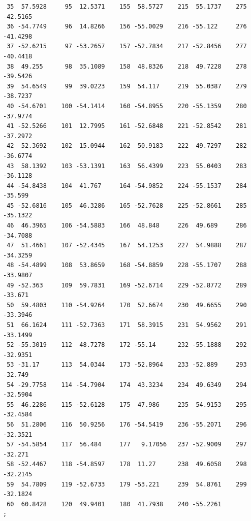 \documentclass{article}
\begin{document}
\begin{verbatim}
 35  57.5928     95  12.5371    155  58.5727    215  55.1737    275 -42.5165
 36 -54.7749     96  14.8266    156 -55.0029    216 -55.122     276 -41.4298
 37 -52.6215     97 -53.2657    157 -52.7834    217 -52.8456    277 -40.4418
 38  49.255      98  35.1089    158  48.8326    218  49.7228    278 -39.5426
 39  54.6549     99  39.0223    159  54.117     219  55.0387    279 -38.7237
 40 -54.6701    100 -54.1414    160 -54.8955    220 -55.1359    280 -37.9774
 41 -52.5266    101  12.7995    161 -52.6848    221 -52.8542    281 -37.2972
 42  52.3692    102  15.0944    162  50.9183    222  49.7297    282 -36.6774
 43  58.1392    103 -53.1391    163  56.4399    223  55.0403    283 -36.1128
 44 -54.8438    104  41.767     164 -54.9852    224 -55.1537    284 -35.599
 45 -52.6816    105  46.3286    165 -52.7628    225 -52.8661    285 -35.1322
 46  46.3965    106 -54.5883    166  48.848     226  49.689     286 -34.7088
 47  51.4661    107 -52.4345    167  54.1253    227  54.9888    287 -34.3259
 48 -54.4899    108  53.8659    168 -54.8859    228 -55.1707    288 -33.9807
 49 -52.363     109  59.7831    169 -52.6714    229 -52.8772    289 -33.671
 50  59.4803    110 -54.9264    170  52.6674    230  49.6655    290 -33.3946
 51  66.1624    111 -52.7363    171  58.3915    231  54.9562    291 -33.1499
 52 -55.3019    112  48.7278    172 -55.14      232 -55.1888    292 -32.9351
 53 -31.17      113  54.0344    173 -52.8964    233 -52.889     293 -32.749
 54 -29.7758    114 -54.7904    174  43.3234    234  49.6349    294 -32.5904
 55  46.2286    115 -52.6128    175  47.986     235  54.9153    295 -32.4584
 56  51.2806    116  50.9256    176 -54.5419    236 -55.2071    296 -32.3521
 57 -54.5854    117  56.484     177   9.17056   237 -52.9009    297 -32.271
 58 -52.4467    118 -54.8597    178  11.27      238  49.6058    298 -32.2145
 59  54.7809    119 -52.6733    179 -53.221     239  54.8761    299 -32.1824
 60  60.8428    120  49.9401    180  41.7938    240 -55.2261
;


\end{verbatim}
\end{document}
